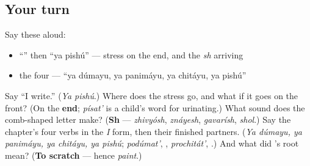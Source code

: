 \subsection*{Your turn}
Say these aloud:

\begin{itemize}
\raggedright
  \item \textquotedblleft{}\textquotedblright{} then \textquotedblleft{}ya pishú\textquotedblright{} — stress on the end, and the \emph{sh} arriving
  \item the four — \textquotedblleft{}ya dúmayu, ya panimáyu, ya chitáyu, ya pishú\textquotedblright{}
\end{itemize}

\begin{tcolorbox}[breakable,colback=teal!4,colframe=teal!35!black,title={Before you move on}]
Say \textquotedblleft{}I write.\textquotedblright{} (\emph{Ya pishú}.) Where does the stress go, and what if it goes on the front? (On the \textbf{end}; \emph{písat'} is a child's word for urinating.) What sound does the comb-shaped letter make? (\textbf{Sh} — \emph{zhivyósh}, \emph{znáyesh}, \emph{gavarísh}, \emph{shol}.) Say the chapter's four verbs in the \emph{I} form, then their finished partners. (\emph{Ya dúmayu, ya panimáyu, ya chitáyu, ya pishú}; \emph{podúmat'}, \textbf{}, \emph{prochitát'}, \textbf{}.) And what did \emph{}'s root mean? (\textbf{To scratch} — hence \emph{paint}.)
\end{tcolorbox}
